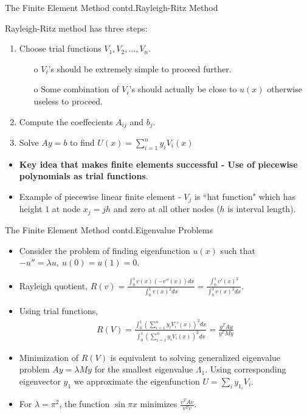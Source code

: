 \documentclass{beamer}
\begin{document}
\begin{frame}{The Finite Element Method contd.}{Rayleigh-Ritz Method}
\begin{exampleblock}{Rayleigh-Ritz method has three steps:}
\begin{enumerate}
    \item Choose trial functions $V_1, V_2, \ldots, V_n$.
        \begin{itemize}
            \item[o] $V_i$'s should be extremely simple to proceed further.
            \item[o] Some combination of $V_i$'s should actually be close to $u(x)$ otherwise useless to proceed.
        \end{itemize}
    \item Compute the coeffecients $A_{ij}$ and $b_j$.
    \item Solve $Ay = b$ to find $U(x) = \sum_{i=1}^{n}y_iV_i(x)$
\end{enumerate}
\begin{itemize}
    \item {
        \textbf{Key idea that makes finite elements successful - Use of piecewise polynomials as trial functions}.
    }
    \item {
        Example of piecewise linear finite element - $V_j$ is ``hat function" which has height $1$ at node $x_j = jh$ and zero at all other nodes ($h$ is interval length).
    }
\end{itemize}
\end{exampleblock}
\end{frame}

\begin{frame}{The Finite Element Method contd.}{Eigenvalue Problems}
\begin{itemize}
    \item {
        Consider the problem of finding eigenfunction $u(x)$ such that $-u'' = \lambda u, \ u(0) = u(1) = 0$.
    }
    \item {
        Rayleigh quotient, $R(v) = \frac{\int_{0}^{1}v(x)(-v''(x))dx}{\int_{0}^{1}v(x)^2dx} = \frac{\int_{0}^{1}v'(x)^2}{\int_{0}^{1}v(x)^2dx}$.
    }
    \item {
        Using trial functions,
        \begin{align*}
            R(V) = \frac{\int_{0}^{1}\left(\sum_{i=1}^{n}y_iV_i'(x)\right)^2dx}{\int_{0}^{1}\left(\sum_{i=1}^{n}y_iV_i(x)\right)^2dx} = \frac{y^TAy}{y^TMy}
        \end{align*}
    }
    \item {
        Minimization of $R(V)$ is equivalent to solving generalized eigenvalue problem $Ay = \lambda My$ for the smallest eigenvalue $\Lambda_1$. Using corresponding eigenvector $y_1$ we approximate the eigenfunction $U = \sum_i y_{1_i}V_i$.
    }
    \item {
        For $\lambda = \pi^2$, the function $\sin\pi x$ minimizes $\frac{v^TAv}{v^Tv}$.
    }
\end{itemize}
\end{frame}
\end{document}
